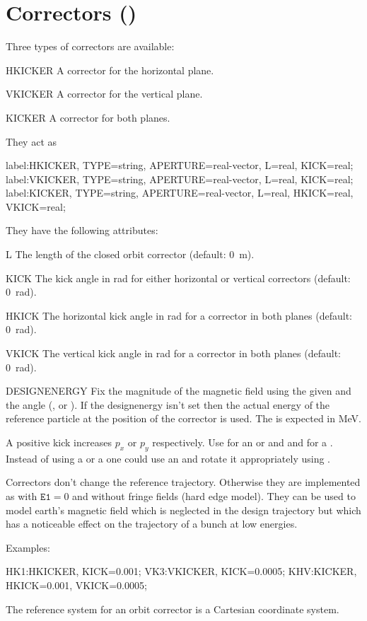 \clearpage
\section{Correctors (\opalt)}
\label{sec:corrector}
Three types of correctors are available:
\begin{kdescription}
\item[HKICKER]
  \label{sec:hkicker}
  A corrector for the horizontal plane.
\item[VKICKER]
  \label{sec:vkicker}
  A corrector for the vertical plane.
\item[KICKER]
  \label{sec:kicker}
  A corrector for both planes.
\end{kdescription}
They act as
\begin{example}
label:HKICKER, TYPE=string, APERTURE=real-vector,
      L=real, KICK=real;
label:VKICKER, TYPE=string, APERTURE=real-vector,
      L=real, KICK=real;
label:KICKER, TYPE=string, APERTURE=real-vector,
      L=real, HKICK=real, VKICK=real;
\end{example}
They have the following attributes:
\begin{kdescription}
\item[L]
  The length of the closed orbit corrector (default: 0~m).
\item[KICK]
  The kick angle in \si{\radian} for either horizontal or vertical correctors
  (default: \SI{0}{\radian}).
\item[HKICK]
  The horizontal kick angle in \si{\radian} for a corrector in both planes
  (default: \SI{0}{\radian}).
\item[VKICK]
  The vertical kick angle in \si{\radian} for a corrector in both planes
  (default: \SI{0}{\radian}).
\item[DESIGNENERGY]
  Fix the magnitude of the magnetic field using the given  and the angle (,  or ). If the designenergy isn't set then the actual energy of the reference particle at the position of the corrector is used. The  is expected in \si{\mega\electronvolt}.
\end{kdescription}
A positive kick increases $p_{x}$ or $p_{y}$
respectively. Use  for an  or  and  and  for a . Instead of using a  or a  one could use an  and rotate it appropriately using .

Correctors don't change the reference trajectory. Otherwise they are implemented as  with $\texttt{E1} = 0$ and without fringe fields (hard edge model). They can be used to model earth's magnetic field which is neglected in the design trajectory but which has a noticeable effect on the trajectory of a bunch at low energies.

\noindent Examples:
\begin{example}
HK1:HKICKER, KICK=0.001;
VK3:VKICKER, KICK=0.0005;
KHV:KICKER, HKICK=0.001, VKICK=0.0005;
\end{example}
The reference system for an orbit corrector is a Cartesian coordinate system.


